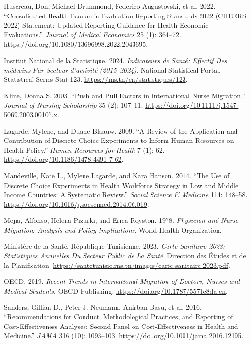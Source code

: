 \documentclass[
  11pt,
  a4paper]{article}
\newlength{\cslhangindent}
\newenvironment{CSLReferences}[2] %
 {\begin{list}{}{%
  \setlength{\itemindent}{0pt}
  \setlength{\leftmargin}{0pt}
  \setlength{\parsep}{0pt}
  \ifodd #1
   \setlength{\leftmargin}{\cslhangindent}
   \setlength{\itemindent}{-1\cslhangindent}
  \fi
  \setlength{\itemsep}{#2\baselineskip}}}
 {\end{list}}
\begin{document}
\begin{CSLReferences}{1}{1}
Husereau, Don, Michael Drummond, Federico Augustovski, et al. 2022.
{``Consolidated Health Economic Evaluation Reporting Standards 2022
({CHEERS} 2022) Statement: Updated Reporting Guidance for Health
Economic Evaluations.''} \emph{Journal of Medical Economics} 25 (1):
364--72. \url{https://doi.org/10.1080/13696998.2022.2043695}.

Institut National de la Statistique. 2024. \emph{Indicateurs de Sant{é}:
Effectif Des m{é}decins Par Secteur d'activit{é} (2015--2024)}. National
Statistical Portal, Statistical Series Stat 123.
\url{https://ins.tn/en/statistiques/123}.

Kline, Donna S. 2003. {``Push and Pull Factors in International Nurse
Migration.''} \emph{Journal of Nursing Scholarship} 35 (2): 107--11.
\url{https://doi.org/10.1111/j.1547-5069.2003.00107.x}.

Lagarde, Mylene, and Duane Blaauw. 2009. {``A Review of the Application
and Contribution of Discrete Choice Experiments to Inform Human
Resources on Health Policy.''} \emph{Human Resources for Health} 7 (1):
62. \url{https://doi.org/10.1186/1478-4491-7-62}.

Mandeville, Kate L., Mylene Lagarde, and Kara Hanson. 2014. {``The Use
of Discrete Choice Experiments in Health Workforce Strategy in Low and
Middle Income Countries: A Systematic Review.''} \emph{Social Science \&
Medicine} 114: 148--58.
\url{https://doi.org/10.1016/j.socscimed.2014.06.019}.

Mejia, Alfonso, Helena Pizurki, and Erica Royston. 1978. \emph{Physician
and Nurse Migration: Analysis and Policy Implications}. World Health
Organization.

Ministère de la Santé, République Tunisienne. 2023. \emph{Carte
Sanitaire 2023: Statistiques Annuelles Du Secteur Public de La Sant{é}}.
Direction des {É}tudes et de la Planification.
\url{https://santetunisie.rns.tn/images/carte-sanitaire-2023.pdf}.

OECD. 2019. \emph{Recent Trends in International Migration of Doctors,
Nurses and Medical Students}. OECD Publishing.
\url{https://doi.org/10.1787/5571c8da-en}.

Sanders, Gillian D., Peter J. Neumann, Anirban Basu, et al. 2016.
{``Recommendations for Conduct, Methodological Practices, and Reporting
of Cost-Effectiveness Analyses: {Second Panel on Cost-Effectiveness in
Health and Medicine}.''} \emph{JAMA} 316 (10): 1093--103.
\url{https://doi.org/10.1001/jama.2016.12195}.


\end{CSLReferences}
\end{document}
